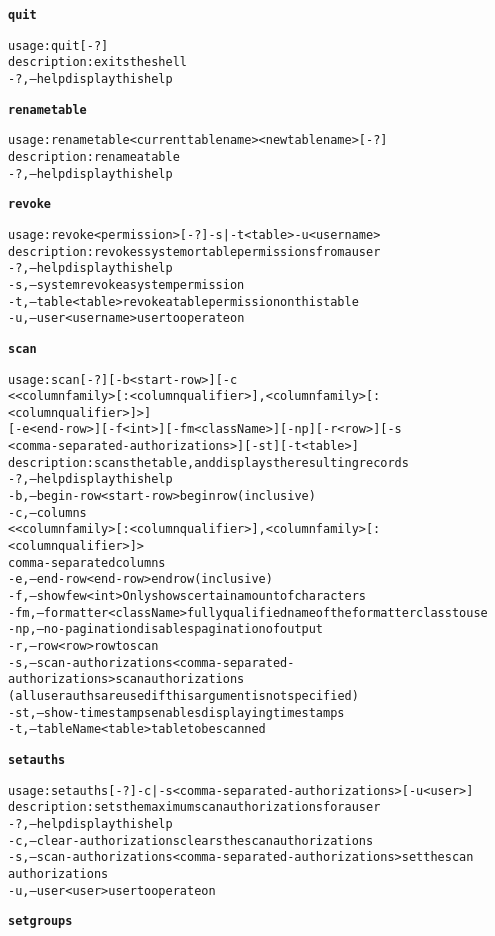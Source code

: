 \begin{alltt}
\textbf{quit}

    usage: quit [-?]
    description: exits the shell
      -?,--help  display this help

\textbf{renametable}

    usage: renametable <current table name> <new table name> [-?]
    description: rename a table
      -?,--help  display this help

\textbf{revoke}

    usage: revoke <permission> [-?] -s | -t <table>  -u <username>
    description: revokes system or table permissions from a user
      -?,--help  display this help
      -s,--system  revoke a system permission
      -t,--table <table>  revoke a table permission on this table
      -u,--user <username>  user to operate on

\textbf{scan}

    usage: scan [-?] [-b <start-row>] [-c
              <<columnfamily>[:<columnqualifier>]{,<columnfamily>[:<columnqualifier>]}>]
              [-e <end-row>] [-f <int>] [-fm <className>] [-np] [-r <row>] [-s
              <comma-separated-authorizations>] [-st] [-t <table>]
    description: scans the table, and displays the resulting records
      -?,--help  display this help
      -b,--begin-row <start-row>  begin row (inclusive)
      -c,--columns
              <<columnfamily>[:<columnqualifier>]{,<columnfamily>[:<columnqualifier>]}> 
              comma-separated columns
      -e,--end-row <end-row>  end row (inclusive)
      -f,--show few <int>  Only shows certain amount of characters
      -fm,--formatter <className>  fully qualified name of the formatter class to use
      -np,--no-pagination  disables pagination of output
      -r,--row <row>  row to scan
      -s,--scan-authorizations <comma-separated-authorizations>  scan authorizations
              (all user auths are used if this argument is not specified)
      -st,--show-timestamps  enables displaying timestamps
      -t,--tableName <table>  table to be scanned

\textbf{setauths}

    usage: setauths [-?] -c | -s <comma-separated-authorizations>  [-u <user>]
    description: sets the maximum scan authorizations for a user
      -?,--help  display this help
      -c,--clear-authorizations  clears the scan authorizations
      -s,--scan-authorizations <comma-separated-authorizations>  set the scan
              authorizations
      -u,--user <user>  user to operate on

\textbf{setgroups}


\end{alltt}
